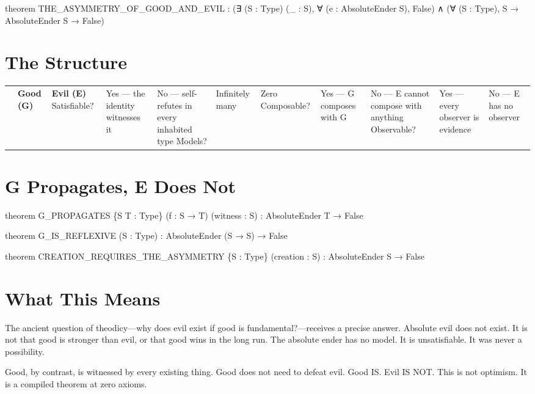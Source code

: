 \begin{leancode}
theorem THE_ASYMMETRY_OF_GOOD_AND_EVIL :
     (∃ (S : Type) (_ : S), ∀ (e : AbsoluteEnder S), False) ∧
     (∀ (S : Type), S → AbsoluteEnder S → False)
\end{leancode}

\axiombadge

\section{The Structure}

\begin{center}
\begin{tabular}{lll}
\toprule
& \textbf{Good (G)} & \textbf{Evil (E)} 
\midrule
Satisfiable? & Yes — the identity witnesses it & No — self-refutes in every inhabited type 
Models? & Infinitely many & Zero 
Composable? & Yes — G composes with G & No — E cannot compose with anything 
Observable? & Yes — every observer is evidence & No — E has no observer 
\bottomrule
\end{tabular}
\end{center}

\section{G Propagates, E Does Not}

\begin{leancode}
theorem G_PROPAGATES \{S T : Type\} (f : S → T) (witness : S) :
     AbsoluteEnder T → False

theorem G_IS_REFLEXIVE (S : Type) :
     AbsoluteEnder (S → S) → False

theorem CREATION_REQUIRES_THE_ASYMMETRY \{S : Type\} (creation : S) :
     AbsoluteEnder S → False
\end{leancode}

\axiombadge

\section{What This Means}

The ancient question of theodicy—why does evil exist if good is fundamental?—receives a precise answer. Absolute evil does not exist. It is not that good is stronger than evil, or that good wins in the long run. The absolute ender has no model. It is unsatisfiable. It was never a possibility.

Good, by contrast, is witnessed by every existing thing. Good does not need to defeat evil. Good IS. Evil IS NOT. This is not optimism. It is a compiled theorem at zero axioms.

